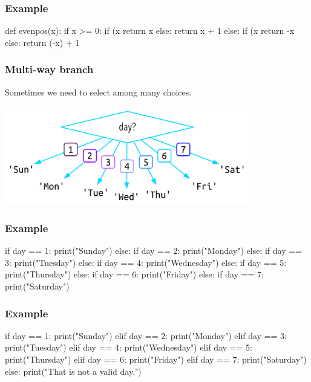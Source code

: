 \documentclass[11pt]{beamer}
\begin{document}
\begin{frame}[fragile]
  \frametitle{Example}
  \Enlarge

  \begin{semiverbatim}
def evenpos(x):
    if x >= 0:
        if (x%
            return x
        else:
            return x + 1
    else:
        if (x%
            return -x
        else:
            return (-x) + 1
  \end{semiverbatim}
\end{frame}

\begin{frame}[fragile]
  \frametitle{Multi-way branch}
  \Enlarge

  \begin{itemize}
  \myitem  Sometimes we need to select among many choices.
  \end{itemize}
  \includegraphics[width=0.8\textwidth]{./img/control-flow-multi.png}
\end{frame}

\begin{frame}[fragile]
  \frametitle{Example}
  \Enlarge

  \begin{semiverbatim}
if day == 1:
    print("Sunday")
else:
    if day == 2:
        print("Monday")
    else:
        if day == 3:
            print("Tuesday")
        else:
            if day == 4:
                print("Wednesday")
            else:
                if day == 5:
                    print("Thursday")
                else:
                    if day == 6:
                        print("Friday")
                    else:
                        if day == 7:
                            print("Saturday")
  \end{semiverbatim}
\end{frame}

\begin{frame}[fragile]
  \frametitle{Example}
  \Enlarge

  \begin{semiverbatim}
if day == 1:
    print("Sunday")
elif day == 2:
    print("Monday")
elif day == 3:
    print("Tuesday")
elif day == 4:
    print("Wednesday")
elif day == 5:
    print("Thursday")
elif day == 6:
    print("Friday")
elif day == 7:
    print("Saturday")
else:
    print("That is not a valid day.")
  \end{semiverbatim}
\end{frame}
\end{document}
